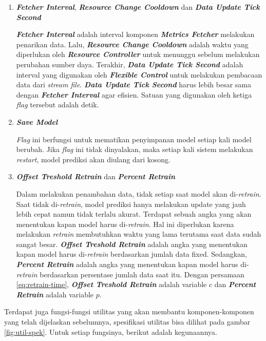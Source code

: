 \begin{enumerate}
    \item \textbf{\textit{Fetcher Interval}}, \textbf{\textit{Resource Change Cooldown}} dan \textbf{\textit{Data Update Tick Second}}
    
    \textbf{\textit{Fetcher Interval}} adalah interval komponen \textbf{\textit{Metrics Fetcher}} melakukan penarikan data. Lalu, \textbf{\textit{Resource Change Cooldown}} adalah waktu yang diperlukan oleh \textbf{\textit{Resource Controller}} untuk menunggu sebelum melakukan perubahan sumber daya. Terakhir, \textbf{\textit{Data Update Tick Second}} adalah interval yang digunakan oleh \textbf{\textit{Flexible Control}} untuk melakukan pembacaan data dari \textit{stream file}. \textbf{\textit{Data Update Tick Second}} harus lebih besar sama dengan \textbf{\textit{Fetcher Interval}} agar efisien. Satuan yang digunakan oleh ketiga \textit{flag} tersebut adalah detik.

    \item \textbf{\textit{Save Model}}
    
    \textit{Flag} ini berfungsi untuk mematikan penyimpanan model setiap kali model berubah. Jika \textit{flag} ini tidak dinyalakan, maka setiap kali sistem melakukan \textit{restart}, model prediksi akan diulang dari kosong.

    \item \textbf{\textit{Offset Treshold Retrain}} dan \textbf{\textit{Percent Retrain}}
    
    Dalam melakukan penambahan data, tidak setiap saat model akan di-\textit{retrain}. Saat tidak di-\textit{retrain}, model prediksi hanya melakukan update yang jauh lebih cepat namun tidak terlalu akurat. Terdapat sebuah angka yang akan menentukan kapan model harus di-\textit{retrain}. Hal ini diperlukan karena melakukan \textit{retrain} membutuhkan waktu yang lama terutama saat data sudah sangat besar. \textbf{\textit{Offset Treshold Retrain}} adalah angka yang menentukan kapan model harus di-\textit{retrain} berdasarkan jumlah data fixed. Sedangkan, \textbf{\textit{Percent Retrain}} adalah angka yang menentukan kapan model harus di-\textit{retrain} berdasarkan persentase jumlah data saat itu. Dengan persamaan \ref{eq:retrain-time}, \textbf{\textit{Offset Treshold Retrain}} adalah variable $c$ dan \textbf{\textit{Percent Retrain}} adalah variable $p$.
\end{enumerate}

Terdapat juga fungsi-fungsi utilitas yang akan membantu komponen-komponen yang telah dijelaskan sebelumnya, spesifikasi utilitas bisa dilihat pada gambar \ref{fig:util-spek}. Untuk setiap fungsinya, berikut adalah kegunaannya.


